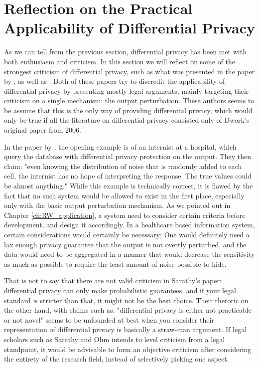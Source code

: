 \section{Reflection on the Practical Applicability of Differential Privacy}
As we can tell from the previous section, differential privacy has been met with both enthusiasm and criticism. In this section we will reflect on some of the strongest criticism of differential privacy, such as what was presented in the paper by \cite{Sarathy2011evaluating}, as well as \cite{ohm2010brokenPrivacyPromise}. Both of these papers try to discredit the applicability of differential privacy by presenting mostly legal arguments, mainly targeting their criticism on a single mechanism: the output perturbation. These authors seems to be assume that this is the only way of providing differential privacy, which would only be true if all the literature on differential privacy consisted only of Dwork's original paper from 2006. 

In the paper by \cite{Sarathy2011evaluating}, the opening example is of an internist at a hospital, which query the database with differential privacy protection on the output. They then claim: "even knowing the distribution of noise that is randomly added to each cell, the internist has no hope of interpreting the response. The true values could be almost anything." While this example is technically correct, it is flawed by the fact that no such system would be allowed to exist in the first place, especially only with the basic output perturbation mechanism. As we pointed out in Chapter \ref{ch:RW_application}, a system need to consider certain criteria before development, and design it accordingly. In a healthcare based information system, certain considerations would certainly be necessary; One would definitely need a lax enough privacy guarantee that the output is not overtly perturbed, and the data would need to be aggregated in a manner that would decrease the sensitivity as much as possible to require the least amount of noise possible to hide.

That is not to say that there are not valid criticism in Sarathy's paper: differential privacy can only make probabilistic guarantees, and if your legal standard is stricter than that, it might not be the best choice. Their rhetoric on the other hand, with claims such as: "differential privacy is either not practicable or not novel" seems to be unfounded at best when you consider their representation of differential privacy is basically a straw-man argument. If legal scholars such as Sarathy and Ohm intends to level criticism from a legal standpoint, it would be advisable to form an objective criticism after considering the entirety of the research field, instead of selectively picking one aspect.

